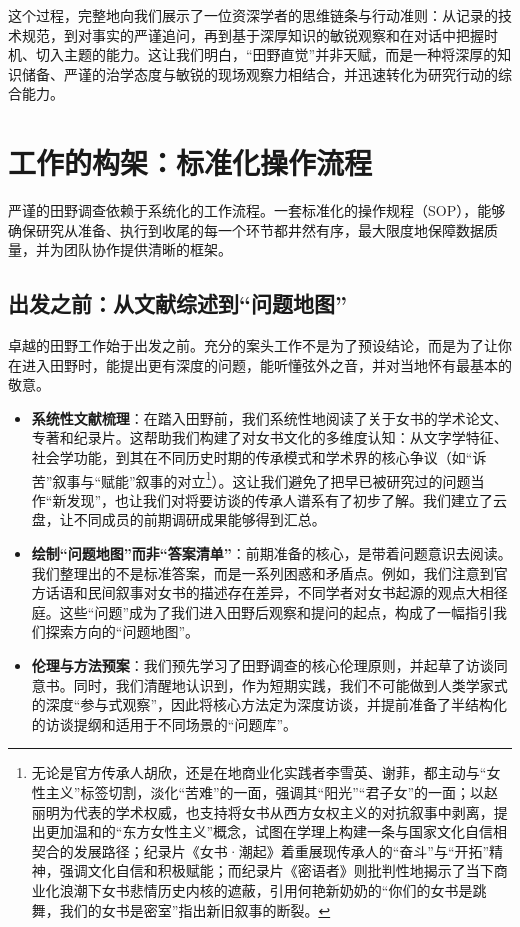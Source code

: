 \documentclass[UTF8]{ctexart}
\begin{document}
这个过程，完整地向我们展示了一位资深学者的思维链条与行动准则：从记录的技术规范，到对事实的严谨追问，再到基于深厚知识的敏锐观察和在对话中把握时机、切入主题的能力。这让我们明白，“田野直觉”并非天赋，而是一种将深厚的知识储备、严谨的治学态度与敏锐的现场观察力相结合，并迅速转化为研究行动的综合能力。
\newpage

\section{工作的构架：标准化操作流程}

严谨的田野调查依赖于系统化的工作流程。一套标准化的操作规程（SOP），能够确保研究从准备、执行到收尾的每一个环节都井然有序，最大限度地保障数据质量，并为团队协作提供清晰的框架。

\subsection{出发之前：从文献综述到“问题地图”}
卓越的田野工作始于出发之前。充分的案头工作不是为了预设结论，而是为了让你在进入田野时，能提出更有深度的问题，能听懂弦外之音，并对当地怀有最基本的敬意。
\begin{itemize}
    \item \textbf{系统性文献梳理}：在踏入田野前，我们系统性地阅读了关于女书的学术论文、专著和纪录片。这帮助我们构建了对女书文化的多维度认知：从文字学特征、社会学功能，到其在不同历史时期的传承模式和学术界的核心争议（如“诉苦”叙事与“赋能”叙事的对立\footnote[1]{无论是官方传承人胡欣，还是在地商业化实践者李雪英、谢菲，都主动与“女性主义”标签切割，淡化“苦难”的一面，强调其“阳光”“君子女”的一面；以赵丽明为代表的学术权威，也支持将女书从西方女权主义的对抗叙事中剥离，提出更加温和的“东方女性主义”概念，试图在学理上构建一条与国家文化自信相契合的发展路径；纪录片《女书·潮起》着重展现传承人的“奋斗”与“开拓”精神，强调文化自信和积极赋能；而纪录片《密语者》则批判性地揭示了当下商业化浪潮下女书悲情历史内核的遮蔽，引用何艳新奶奶的“你们的女书是跳舞，我们的女书是密室”指出新旧叙事的断裂。}）。这让我们避免了把早已被研究过的问题当作“新发现”，也让我们对将要访谈的传承人谱系有了初步了解。我们建立了云盘，让不同成员的前期调研成果能够得到汇总。
    \item \textbf{绘制“问题地图”而非“答案清单”}：前期准备的核心，是带着问题意识去阅读。我们整理出的不是标准答案，而是一系列困惑和矛盾点。例如，我们注意到官方话语和民间叙事对女书的描述存在差异，不同学者对女书起源的观点大相径庭。这些“问题”成为了我们进入田野后观察和提问的起点，构成了一幅指引我们探索方向的“问题地图”。
    \item \textbf{伦理与方法预案}：我们预先学习了田野调查的核心伦理原则，并起草了访谈同意书。同时，我们清醒地认识到，作为短期实践，我们不可能做到人类学家式的深度“参与式观察”，因此将核心方法定为深度访谈，并提前准备了半结构化的访谈提纲和适用于不同场景的“问题库”。
\end{itemize}
\end{document}
